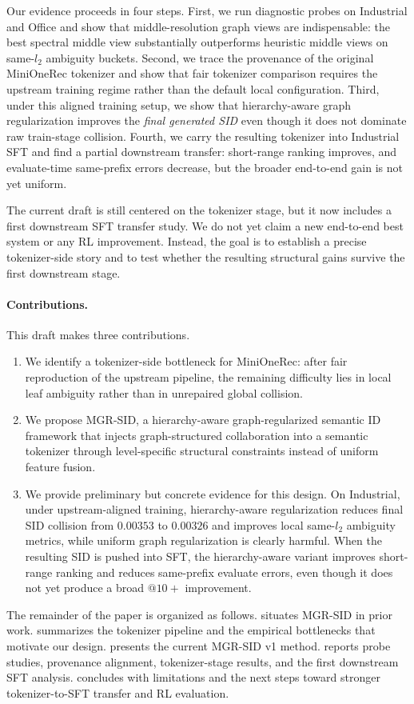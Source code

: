 Our evidence proceeds in four steps. First, we run diagnostic probes on Industrial and Office and show that middle-resolution graph views are indispensable: the best spectral middle view substantially outperforms heuristic middle views on same-$l_2$ ambiguity buckets. Second, we trace the provenance of the original MiniOneRec tokenizer and show that fair tokenizer comparison requires the upstream \rqvae{} training regime rather than the default local configuration. Third, under this aligned training setup, we show that hierarchy-aware graph regularization improves the \emph{final generated SID} even though it does not dominate raw train-stage collision. Fourth, we carry the resulting tokenizer into Industrial SFT and find a partial downstream transfer: short-range ranking improves, and evaluate-time same-prefix errors decrease, but the broader end-to-end gain is not yet uniform.

The current draft is still centered on the tokenizer stage, but it now includes a first downstream SFT transfer study. We do not yet claim a new end-to-end best system or any RL improvement. Instead, the goal is to establish a precise tokenizer-side story and to test whether the resulting structural gains survive the first downstream stage.

\paragraph{Contributions.} This draft makes three contributions.
\begin{enumerate}[leftmargin=1.4em]
  \item We identify a tokenizer-side bottleneck for MiniOneRec: after fair reproduction of the upstream pipeline, the remaining difficulty lies in local leaf ambiguity rather than in unrepaired global collision.
  \item We propose MGR-SID, a hierarchy-aware graph-regularized semantic ID framework that injects graph-structured collaboration into a semantic tokenizer through level-specific structural constraints instead of uniform feature fusion.
  \item We provide preliminary but concrete evidence for this design. On Industrial, under upstream-aligned \rqvae{} training, hierarchy-aware regularization reduces final SID collision from $0.00353$ to $0.00326$ and improves local same-$l_2$ ambiguity metrics, while uniform graph regularization is clearly harmful. When the resulting SID is pushed into SFT, the hierarchy-aware variant improves short-range ranking and reduces same-prefix evaluate errors, even though it does not yet produce a broad $@10+$ improvement.
\end{enumerate}

The remainder of the paper is organized as follows.  situates MGR-SID in prior work.  summarizes the tokenizer pipeline and the empirical bottlenecks that motivate our design.  presents the current MGR-SID v1 method.  reports probe studies, provenance alignment, tokenizer-stage results, and the first downstream SFT analysis.  concludes with limitations and the next steps toward stronger tokenizer-to-SFT transfer and RL evaluation.
